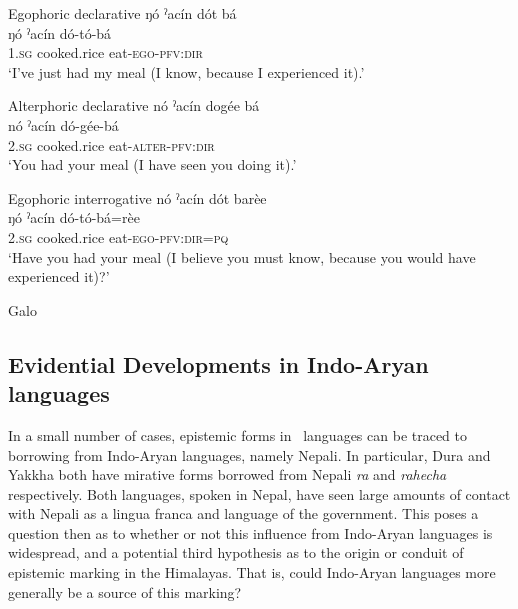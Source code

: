 \begin{exe}
    \ex\label{e:History:Galo}
    \begin{xlist}
    \ex Egophoric declarative
    \glll ŋó ˀacín dót bá \\
    ŋó ˀacín dó-tó-bá \\
    1.\textsc{sg} cooked.rice eat-\textsc{ego-pfv:dir} \\
    \glt `I've just had my meal (I know, because I experienced it).'

    \ex Alterphoric declarative
    \glll nó ˀacín dogée bá \\
    nó ˀacín dó-gée-bá \\
    2.\textsc{sg} cooked.rice eat-\textsc{alter-pfv:dir} \\
    \glt `You had your meal (I have seen you doing it).'

    \ex Egophoric interrogative
    \glll nó ˀacín dót barèe \\
    ŋó ˀacín dó-tó-bá=rèe \\
    2.\textsc{sg} cooked.rice eat-\textsc{ego-pfv:dir=pq} \\
    \glt `Have you had your meal (I believe you must know, because you would have experienced it)?'
    \end{xlist}
    Galo \cite[Tani: India,][114]{Post2013}
\end{exe}


\subsection{Evidential Developments in Indo-Aryan languages}
In a small number of cases, epistemic forms in \lfam\ languages can be traced to borrowing from Indo-Aryan languages, namely Nepali. In particular, Dura \cite[Internal Isolate: Nepal,][279]{Schorer2016} and Yakkha \cite[Kiranti: Nepal,][520]{Schackow2015} both have mirative forms borrowed from Nepali \textit{ra} and \textit{rahecha} respectively. Both languages, spoken in Nepal, have seen large amounts of contact with Nepali as a lingua franca and language of the government. This poses a question then as to whether or not this influence from Indo-Aryan languages is widespread, and a potential third hypothesis as to the origin or conduit of epistemic marking in the Himalayas. That is, could Indo-Aryan languages more generally be a source of this marking?

